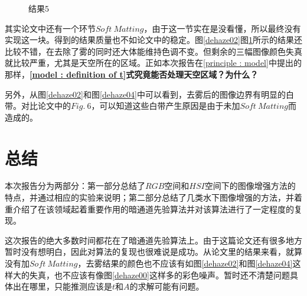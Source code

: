 \documentclass[UTF8]{ctexart}
\begin{document}
\begin{figure}[H]
                                       \caption{结果5}
                                       \label{dehaze05}
                                   \end{figure}                                   
                \indent 其实论文中还有一个环节$Soft\ Matting$，由于这一节实在是没看懂，所以最终没有实现这一块。得到的结果质量也不如论文中的稳定。图\ref{dehaze02}图\ref{dehaze05}所示的结果还比较不错，在去除了雾的同时还大体能维持色调不变。但剩余的三幅图像颜色失真就比较严重，尤其是天空所在的区域。正如本次报告在\ref{principle : model}中提出的那样，\textbf{\ref{model : definition of t}式究竟能否处理天空区域？为什么？}
                
                \indent 另外，从图\ref{dehaze02}和图\ref{dehaze04}中可以看到，去雾后的图像边界有明显的白带。对比论文中的$Fig.\ 6$，可以知道这些白带产生原因是由于未加$Soft\ Matting$而造成的。
            



		

            



        

            


	\section{总结}
		\indent 本次报告分为两部分：第一部分总结了$RGB$空间和$HSI$空间下的图像增强方法的特点，并通过相应的实验来说明；第二部分总结了几类水下图像增强的方法，并着重介绍了在该领域起着重要作用的暗通道先验算法并对该算法进行了一定程度的复现。
        
        \indent 这次报告的绝大多数时间都花在了暗通道先验算法上。由于这篇论文还有很多地方暂时没有想明白，因此对算法的复现也很难说是成功。从论文里的结果来看，就算没有加$Soft\ Matting$，去雾结果的颜色也不应该有如图\ref{dehaze02}和图\ref{dehaze04}这样大的失真，也不应该有像图\ref{dehaze00}这样多的彩色噪声。暂时还不清楚问题具体出在哪里，只能推测应该是$t$和$A$的求解可能有问题。
        
		

		
	
	
%
%

\end{document}
